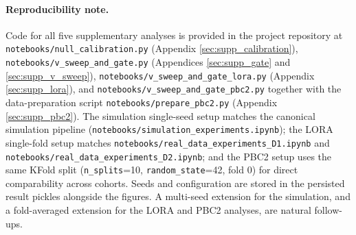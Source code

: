 \documentclass[AMA,Times1COL]{WileyNJDv5} %
\begin{document}
\paragraph*{Reproducibility note.} Code for all five supplementary analyses is provided in the project repository at \texttt{notebooks/null\_calibration.py} (Appendix \ref{sec:supp_calibration}), \texttt{notebooks/v\_sweep\_and\_gate.py} (Appendices \ref{sec:supp_gate} and \ref{sec:supp_v_sweep}), \texttt{notebooks/v\_sweep\_and\_gate\_lora.py} (Appendix \ref{sec:supp_lora}), and \texttt{notebooks/v\_sweep\_and\_gate\_pbc2.py} together with the data-preparation script \texttt{notebooks/prepare\_pbc2.py} (Appendix \ref{sec:supp_pbc2}). The simulation single-seed setup matches the canonical simulation pipeline (\texttt{notebooks/simulation\_experiments.ipynb}); the LORA single-fold setup matches \texttt{notebooks/real\_data\_experiments\_D1.ipynb} and \texttt{notebooks/real\_data\_experiments\_D2.ipynb}; and the PBC2 setup uses the same KFold split (\texttt{n\_splits}=10, \texttt{random\_state}=42, fold $0$) for direct comparability across cohorts. Seeds and configuration are stored in the persisted result pickles alongside the figures. A multi-seed extension for the simulation, and a fold-averaged extension for the LORA and PBC2 analyses, are natural follow-ups.


\vskip 0.2in

\end{document}
